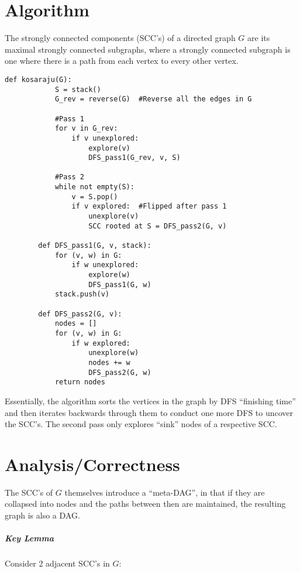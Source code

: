 \documentclass[11pt]{article}
\begin{document}
\section{Algorithm}
	The strongly connected components (SCC's) of a directed graph $G$ are its maximal strongly connected subgraphs, where a strongly connected subgraph is one where there is a path from each vertex to every other vertex.
	
	\begin{lstlisting}[autogobble=true]
		def kosaraju(G):
			S = stack()
			G_rev = reverse(G)	#Reverse all the edges in G
			
			#Pass 1
			for v in G_rev:
				if v unexplored:
					explore(v)
					DFS_pass1(G_rev, v, S)
			
			#Pass 2
			while not empty(S):
				v = S.pop()
				if v explored:	#Flipped after pass 1
					unexplore(v)
					SCC rooted at S = DFS_pass2(G, v)
					
		def DFS_pass1(G, v, stack):
			for (v, w) in G:
				if w unexplored:
					explore(w)
					DFS_pass1(G, w)
			stack.push(v)
			
		def DFS_pass2(G, v):
			nodes = []
			for (v, w) in G:
				if w explored:
					unexplore(w)
					nodes += w
					DFS_pass2(G, w)
			return nodes
	\end{lstlisting}
	
	Essentially, the algorithm sorts the vertices in the graph by DFS ``finishing time'' and then iterates backwards through them to conduct one more DFS to uncover the SCC's. The second pass only explores ``sink'' nodes of a respective SCC.
	
\section{Analysis/Correctness}
	The SCC's of $G$ themselves introduce a ``meta-DAG'', in that if they are collapsed into nodes and the paths between then are maintained, the resulting graph is also a DAG.
	
	\subparagraph{Key Lemma} Consider 2 adjacent SCC's in $G$:
	
	\begin{center}
	\end{center}
	
\end{document}
